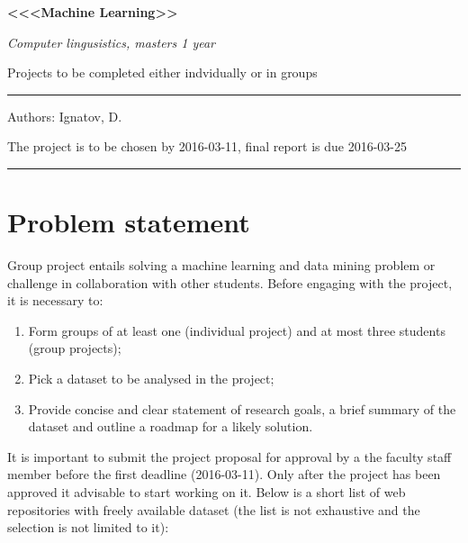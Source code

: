 \documentclass[12pt]{article}         %
\begin{document}
\begin{center}
\textbf{\large <<<Machine Learning>>}

\textit{Computer lingusistics, masters 1 year}

\end{center}
\begin{center}
{\large Projects to be completed either indvidually or in groups}
\end{center}
\hrule
Authors: Ignatov, D.


The project is to be chosen by 2016-03-11, final report is due 2016-03-25

\hrule


\section*{Problem statement}
Group project entails solving a machine learning and data mining problem or challenge in collaboration with other students.
Before engaging with the project, it is necessary to:
\begin{enumerate}

  \item Form groups of at least one (individual project) and at most three students (group projects);
  \item Pick a dataset to be analysed in the project;
  \item Provide concise and clear statement of research goals, a brief summary of the dataset
  and outline a roadmap for a likely solution.

\end{enumerate}
It is important to submit the project proposal for approval by a the faculty staff 
member before the first deadline (2016-03-11). Only after the project has been approved
it advisable to start working on it. Below is a short list of web repositories with
freely available dataset (the list is not exhaustive and the selection is not limited
to it):
\end{document}
